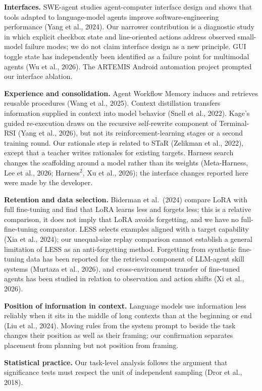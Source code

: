 \documentclass[
  10pt,
]{article}
\begin{document}
\textbf{Interfaces.} SWE-agent studies agent-computer interface design
and shows that tools adapted to language-model agents improve
software-engineering performance (Yang et al., 2024). Our narrower
contribution is a diagnostic study in which explicit checkbox state and
line-oriented actions address observed small-model failure modes; we do
not claim interface design as a new principle. GUI toggle state has
independently been identified as a failure point for multimodal agents
(Wu et al., 2026). The ARTEMIS Android automation project prompted our
interface ablation.

\textbf{Experience and consolidation.} Agent Workflow Memory induces and
retrieves reusable procedures (Wang et al., 2025). Context distillation
transfers information supplied in context into model behavior (Snell et
al., 2022). Kage's guided re-execution draws on the recursive
self-rewrite component of Terminal-RSI (Yang et al., 2026), but not its
reinforcement-learning stages or a second training round. Our rationale
step is related to STaR (Zelikman et al., 2022), except that a teacher
writes rationales for existing targets. Harness search changes the
scaffolding around a model rather than its weights (Meta-Harness, Lee et
al., 2026; Harness\(^2\), Xu et al., 2026); the interface changes
reported here were made by the developer.

\textbf{Retention and data selection.} Biderman et al.~(2024) compare
LoRA with full fine-tuning and find that LoRA learns less and forgets
less; this is a relative comparison, it does not imply that LoRA avoids
forgetting, and we have no full-fine-tuning comparator. LESS selects
examples aligned with a target capability (Xia et al., 2024); our
unequal-size replay comparison cannot establish a general limitation of
LESS as an anti-forgetting method. Forgetting from synthetic fine-tuning
data has been reported for the retrieval component of LLM-agent skill
systems (Murtaza et al., 2026), and cross-environment transfer of
fine-tuned agents has been studied in relation to observation and action
shifts (Xi et al., 2026).

\textbf{Position of information in context.} Language models use
information less reliably when it sits in the middle of long contexts
than at the beginning or end (Liu et al., 2024). Moving rules from the
system prompt to beside the task changes their position as well as their
framing; our confirmation separates placement from planning but not
position from framing.

\textbf{Statistical practice.} Our task-level analysis follows the
argument that significance tests must respect the unit of independent
sampling (Dror et al., 2018).
\end{document}
